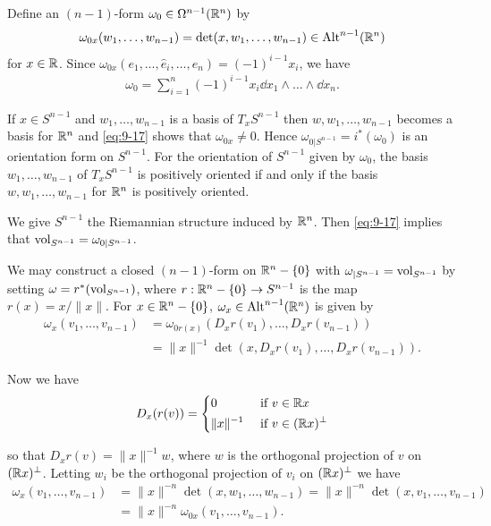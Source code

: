 \begin{example}\label{example:9-18}
  Define an $(n - 1)$-form $\omega_0\in \Omega^{n-1}({\mathbb{R}}^n)$ by
  \begin{align}\label{eq:9-17}
    \omega_{0x}(w_1, \ldots, w_{n-1})
    = \det (x, w_1, \ldots, w_{n-1})\in \operatorname{Alt}^{n-1}({\mathbb{R}}^n) 
  \end{align}
  for $x\in{\ensuremath{\mathbb{R}}}$. Since $\omega_{0x}(e_1, \ldots, \hat{e}_i, \ldots, e_n) = (-1)^{i-1}x_i$, we have 
  \begin{align}\label{eq:9-18}
    \omega_0 = \sum_{i=1}^{n }{(-1)^{i-1} x_i \dd x_1\wedge\ldots\wedge\dd x_n}.
  \end{align}

  If $x\in S^{n-1}$ and $w_1, \ldots, w_{n-1}$ is a basis of $T_xS^{n-1}$ then $w, w_1, \ldots, w_{n-1}$
  becomes a basis for ${\mathbb{R}}^n$ and \eqref{eq:9-17} shows that $\omega_{0x}\neq 0$. Hence $\omega_{0|S^{n-1}} = i^*(\omega_0)$
  is an orientation form on $S^{n-1}$. For the orientation of $S^{n-1}$ given by $\omega_0$, the
  basis $w_1, \ldots, w_{n-1}$ of $T_xS^{n-1}$ is positively oriented if and only if the basis
  $w, w_1, \ldots, w_{n-1}$ for ${\mathbb{R}}^n$ is positively oriented.

  We give $S^{n-1}$ the Riemannian structure induced by ${\mathbb{R}}^n$. Then \eqref{eq:9-17} implies that
  $\mathrm{vol}_{S^{n-1}} = \omega_{0|S^{n-1}}$.

  We may construct a closed $(n-1)$-form on ${\mathbb{R}}^n-\{0\}$ with $\omega_{|S^{n-1}} = \mathrm{vol}_{S^{n-1}}$
  by setting $\omega = r^*(\mathrm{vol}_{S^{n-1}})$, where $r:{\mathbb{R}}^n-\{0\}\to S^{n-1}$ is the map $r(x) = x/\|x\|$.
  For $x\in{\ensuremath{\mathbb{R}}}^n-\{0\}$, $\omega_x\in\operatorname{Alt}^{n-1}({\mathbb{R}}^n)$ is given by 
  \begin{align*}
      \omega_x(v_1, \ldots, v_{n-1}) 
        & = \omega_{0r(x)}(D_xr(v_1), \ldots, D_xr(v_{n-1})) \\
        & = \|x\|^{-1}\det (x, D_x r(v_1), \ldots, D_xr(v_{n-1})).
  \end{align*}

  Now we have 
  \begin{align*}
    D_x(r(v)) = \left\{\begin{aligned}
      & 0         && \text{ if } v\in {\ensuremath{\mathbb{R}}} x \\
      & \|x\|^{-1}&& \text{ if } v\in ({\mathbb{R}} x)^{\perp} 
    \end{aligned}\right.
  \end{align*}

  so that $D_xr(v) = \|x\|^{-1}w$, where $w$ is the orthogonal projection of $v$ on $({\mathbb{R}} x)^\perp$.
  Letting $w_i$ be the orthogonal projection of $v_i$ on $({\mathbb{R}} x)^\perp$ we have
  \begin{align*}
    \omega_x (v_1, \ldots, v_{n-1})
    & = \|x\|^{-n} \det (x, w_1, \ldots, w_{n-1}) 
      = \|x\|^{-n} \det (x, v_1, \ldots, v_{n-1}) \\
    & = \|x\|^{-n} \omega_{0x}(v_1, \ldots, v_{n-1}).
  \end{align*}


\end{example}
